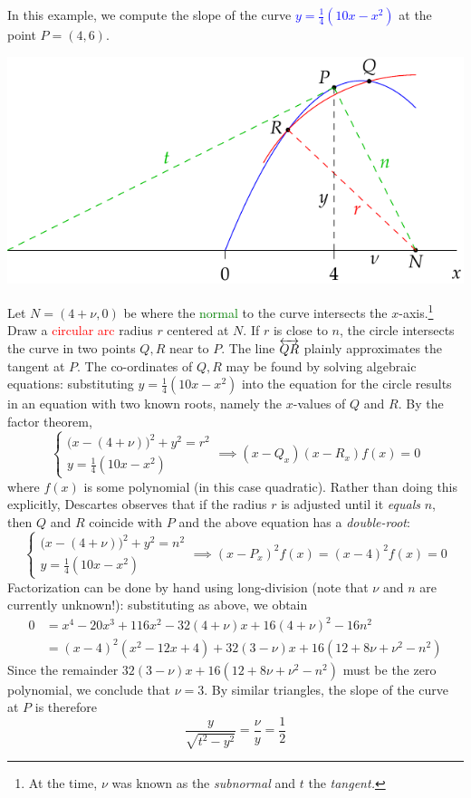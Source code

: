 In this example, we compute the slope of the curve \textcolor{blue}{$y=\frac 14(10x-x^2)$} at the point $P=(4,6)$.
\begin{center}
	\includegraphics[scale=0.9]{analytic-desnormal}
\end{center}
Let $N=(4+\nu,0)$ be where the \textcolor{Green}{normal} to the curve intersects the $x$-axis.\footnote{%
	At the time, $\nu$ was known as the \emph{subnormal} and $t$ the \emph{tangent.}
}
Draw a \textcolor{red}{circular arc} radius $r$ centered at $N$.
If $r$ is close to $n$, the circle intersects the curve in two points $Q,R$ near to $P$. The line $\overleftrightarrow{QR}$ plainly approximates the tangent at $P$.
\smallbreak
The co-ordinates of $Q,R$ may be found by solving algebraic equations: substituting $y=\frac 14(10x-x^2)$ into the equation for the circle results in an equation with two known roots, namely the $x$-values of $Q$ and $R$. By the factor theorem,
\[
	\begin{cases}
		\bigl(x-(4+\nu)\bigr)^2+y^2=r^2\\
		y=\frac 14(10x-x^2)
	\end{cases}
	\implies (x-Q_x)(x-R_x)f(x)=0
\]
where $f(x)$ is some polynomial (in this case quadratic). Rather than doing this explicitly, Descartes observes that if the radius $r$ is adjusted until it \emph{equals} $n$, then $Q$ and $R$ coincide with $P$ and the above equation has a \emph{double-root}:
\[
	\begin{cases}
		\bigl(x-(4+\nu)\bigr)^2+y^2=n^2\\
		y=\frac 14(10x-x^2)
	\end{cases}
	\implies (x-P_x)^2f(x)=(x-4)^2f(x)=0
\]
Factorization can be done by hand using long-division (note that $\nu$ and $n$ are currently unknown!): substituting as above, we obtain
\begin{align*}
	0&=x^4-20x^3+116x^2-32(4+\nu)x+16(4+\nu)^2-16n^2\\
	&=(x-4)^2(x^2-12x+4)+32(3-\nu)x+16(12+8\nu+\nu^2-n^2)
\end{align*}
Since the remainder $32(3-\nu)x+16(12+8\nu+\nu^2-n^2)$ must be the zero polynomial, we conclude that $\nu=3$.
By similar triangles, the slope of the curve at $P$ is therefore
\[
	\frac y{\sqrt{t^2-y^2}}=\frac\nu y=\frac 12
\]
\goodbreak



